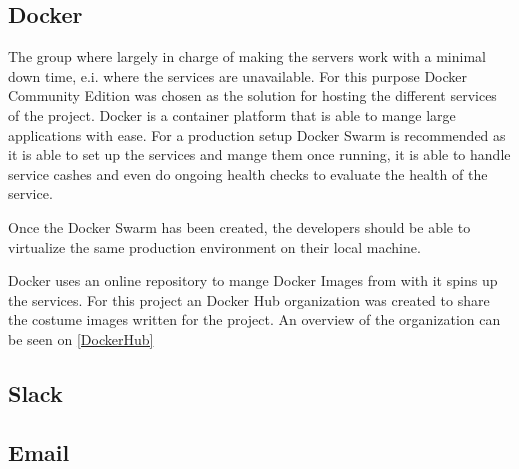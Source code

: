 

\subsection{Docker}
The group where largely in charge of making the servers work with a minimal down time, e.i. where the services are unavailable.
For this purpose Docker Community Edition was chosen as the solution for hosting the different services of the project. 
Docker is a container platform that is able to mange large applications with ease. 
For a production setup Docker Swarm is recommended as it is able to set up the services and mange them once running, it is able to handle service cashes and even do ongoing health checks to evaluate the health of the service. 

Once the Docker Swarm has been created, the developers should be able to virtualize the same production environment on their local machine. 

Docker uses an online repository to mange Docker Images from with it spins up the services. 
For this project an Docker Hub organization was created to share the costume images written for the project. 
An overview of the organization can be seen on \autoref{DockerHub}


\subsection{Slack}



\subsection{Email}
